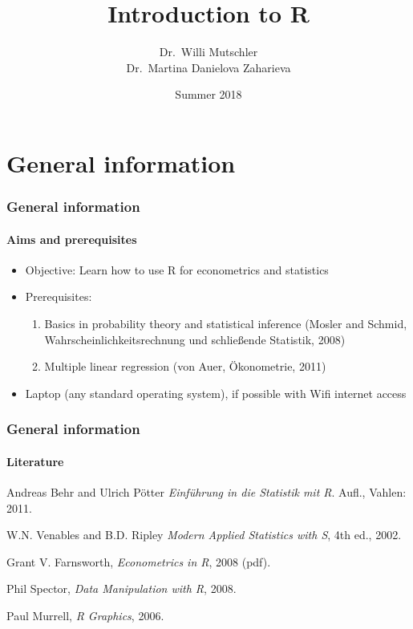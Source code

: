 \documentclass[title={Introduction to R}, author={Mutschler and Zaharieva}, inst={Institute for Econometrics and Empirical Economics}]{beamer}
\begin{document}
\title[Introduction to R]{Introduction to R}
\author[ \ ]{Dr.\ Willi Mutschler \\ \vspace{0.5cm} Dr.\ Martina Danielova Zaharieva}
\date{Summer 2018}
\institute[CQE]{\ }
\maketitle

\section{General information}

\begin{frame}
\frametitle{General information}
\framesubtitle{Aims and prerequisites}
\begin{itemize}
\item Objective: Learn how to use R for econometrics and statistics
\item Prerequisites:
\begin{enumerate}
\item Basics in probability theory and statistical inference\newline
(Mosler and Schmid, Wahrscheinlichkeitsrechnung und schlie\ss ende
Statistik, 2008)
\item Multiple linear regression\newline
(von Auer, \"{O}konometrie, 2011)
\end{enumerate}
\item Laptop (any standard operating system), \newline
if possible with Wifi internet access
\end{itemize}
\end{frame}


\begin{frame}
\frametitle{General information}
\framesubtitle{Literature}
\begin{description}
\item[Essential:] Andreas Behr and Ulrich P\"{o}tter%
\newline
\emph{Einf\"{u}hrung in die Statistik mit R}. Aufl., Vahlen: 2011.\medskip
\item[Additional:] W.N. Venables and B.D. Ripley\newline
\emph{Modern Applied Statistics with S}, 4th ed., 2002.\smallskip
\item Grant V. Farnsworth, \emph{Econometrics in R}, 2008 (pdf).\smallskip
\item Phil Spector, \emph{Data Manipulation with R}, 2008.\smallskip
\item Paul Murrell, \emph{R Graphics}, 2006.
\end{description}
\end{frame}
\end{document}
